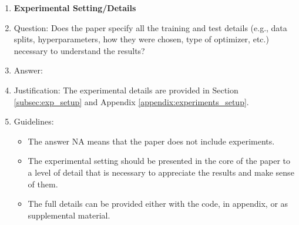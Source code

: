 \documentclass{article}
\theoremstyle{plain}
\theoremstyle{definition}
\theoremstyle{remark}
\begin{document}
\begin{enumerate}
\item {\bf Experimental Setting/Details}
    \item[] Question: Does the paper specify all the training and test details (e.g., data splits, hyperparameters, how they were chosen, type of optimizer, etc.) necessary to understand the results?
    \item[] Answer: \answerYes{} %
    \item[] Justification: The experimental details are provided in Section \ref{subsec:exp_setup} and Appendix \ref{appendix:experiments_setup}.
    \item[] Guidelines:
    \begin{itemize}
        \item The answer NA means that the paper does not include experiments.
        \item The experimental setting should be presented in the core of the paper to a level of detail that is necessary to appreciate the results and make sense of them.
        \item The full details can be provided either with the code, in appendix, or as supplemental material.
    \end{itemize}


\end{enumerate}
\end{document}
